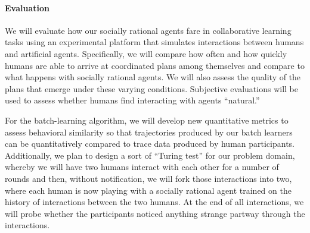 
\vspace{\up}
\paragraph{Evaluation}

We will evaluate how our socially rational agents fare in
collaborative learning tasks using an experimental platform that
simulates interactions between humans and artificial agents.
Specifically, we will compare how often and how quickly humans are
able to arrive at coordinated plans among themselves and compare to what happens with
socially rational agents.  We will also assess the quality of the
plans that emerge under these varying conditions.  
Subjective evaluations will be used to assess whether humans
find interacting with agents ``natural.''

For the batch-learning algorithm, we will develop new quantitative
metrics to assess behavioral similarity so that trajectories produced
by our batch learners can be quantitatively compared to trace data
produced by human participants.  Additionally, we plan to design a
sort of ``Turing test'' for our problem domain, whereby we will have
two humans interact with each other for a number of rounds and then,
without notification, we will fork those interactions into two, where
each human is now playing with a socially rational agent trained
on the history of interactions between the two humans.  At the end of
all interactions, we will probe whether the participants noticed anything
strange partway through the interactions.


